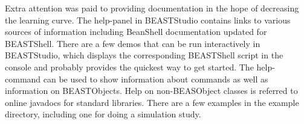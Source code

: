 \documentclass[twoside,11pt]{article}
\begin{document}
Extra attention was paid to providing documentation in the hope of decreasing
the learning curve. The help-panel in BEASTStudio contains links to various sources 
of information including BeanShell documentation updated for BEASTShell.
There are a few demos that can be run interactively in BEASTStudio, which displays the 
corresponding BEASTShell script in the console and probably provides the quickest way
to get started. The help-command can be used to show information about commands as 
well as information on BEASTObjects. Help on non-BEASObject classes is referred to
online javadocs for standard libraries. There are a few examples in the example directory,
including one for doing a simulation study.



\vskip 0.2in

\end{document}
